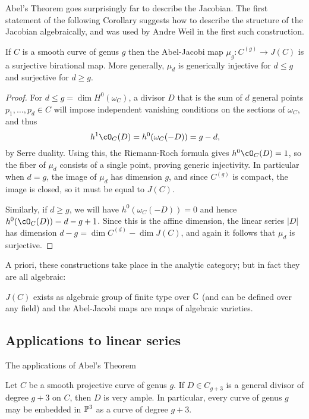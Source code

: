 Abel's Theorem goes surprisingly far to describe the Jacobian. The first statement of the following Corollary suggests how to describe the structure of the Jacobian algebraically, and was used by Andre Weil in the first such construction.

\begin{corollary}
If $C$ is a smooth curve of genus $g$ then the Abel-Jacobi map $\mu_{g}: C^{(g)} \to J(C)$ is a surjective birational map.
More generally, $\mu_{d}$ is generically injective for $d\leq g$ and surjective for $d\geq g$.
\end{corollary}

\begin{proof}
For $d\leq g = \dim H^{0}(\omega_{C})$,  a divisor $D$ that is the sum of $d$ general points $p_{1}, \dots,  p_{d} \in C$ will impose independent vanishing conditions on the sections of $\omega_{C}$, and thus
$$
h^{1}\cO_{C}(D) = h^0(\omega_C(-D)) = g-d,
$$
by Serre duality. Using this, the Riemann-Roch formula gives $h^{0}\cO_{C}(D) = 1$, so the fiber of 
$\mu_{d}$ consists of a single point, proving generic injectivity. In particular when $d= g$, the image of $\mu_{d}$ has
dimension $g$, and since $C^{(g)}$ is compact, the image is closed, so it must be equal to $J(C)$.

Similarly, if $d \geq g$, we will have $h^0(\omega_C(-D)) = 0$ and hence $h^0(\cO_C(D)) = d-g+1$. Since this is the affine
dimension, the linear series $|D|$ has dimension $d-g = \dim C^{(d)} - \dim J(C)$, and again it follows that
$\mu_{d}$ is surjective.
\end{proof}


A priori, these constructions take place in the analytic category; but in fact they are all algebraic:

\begin{fact}
$J(C)$ exists as algebraic group of finite type over $\CC$ (and can be defined over any field) and the Abel-Jacobi maps are
maps of algebraic varieties.
\end{fact}

\subsection{Applications to linear series}

The applications of Abel's Theorem
\begin{theorem}\label{g+3 theorem}
Let $C$ be a smooth projective curve of genus $g$. If $D \in C_{g+3}$ is a general divisor of degree $g+3$ on $C$, then 
$D$ is very ample. In particular, every curve of genus $g$ may be embedded in $\PP^{3}$ as a curve of degree $g+3$.
\end{theorem}

